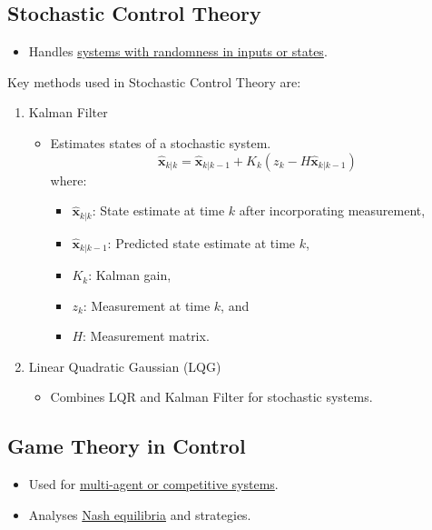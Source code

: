 \documentclass{article}
\begin{document}
\subsection{Stochastic Control Theory}
\begin{itemize}
    \item Handles \underline{systems with randomness in inputs or states}.
\end{itemize}
Key methods used in Stochastic Control Theory are:
\begin{enumerate}
    \item Kalman Filter
        \begin{itemize}
            \item Estimates states of a stochastic system.
                \[ \hat{\mathbf{x}}_{k|k} = \hat{\mathbf{x}}_{k|k-1} + K_{k}(z_{k} - H\hat{\mathbf{x}}_{k|k-1}) \]
                where:
                \begin{itemize}
                    \item $\hat{\mathbf{x}}_{k|k}$: State estimate at time $k$ after incorporating measurement,
                    \item $\hat{\mathbf{x}}_{k|k-1}$: Predicted state estimate at time $k$,
                    \item $K_k$: Kalman gain,
                    \item $z_k$: Measurement at time $k$, and
                    \item $H$: Measurement matrix.
                \end{itemize}
        \end{itemize}
    \item Linear Quadratic Gaussian (LQG)
        \begin{itemize}
            \item Combines LQR and Kalman Filter for stochastic systems.
        \end{itemize}
\end{enumerate}

\subsection{Game Theory in Control}
\begin{itemize}
    \item Used for \underline{multi-agent or competitive systems}.
    \item Analyses \underline{Nash equilibria} and strategies.
\end{itemize}
\end{document}
